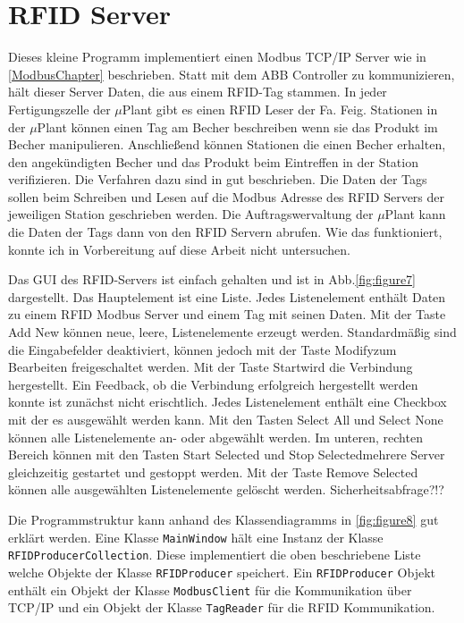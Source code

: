 \newpage
\section {RFID Server}

Dieses kleine Programm implementiert einen Modbus TCP/IP Server wie in \ref{ModbusChapter} beschrieben.
Statt mit dem ABB Controller zu kommunizieren, hält dieser Server Daten, die aus einem RFID-Tag stammen.
In jeder Fertigungszelle der $\mu$Plant gibt es einen RFID Leser der Fa. Feig.
Stationen in der $\mu$Plant können einen Tag am Becher beschreiben wenn sie das Produkt im Becher manipulieren.
Anschließend können Stationen die einen Becher erhalten, den angekündigten Becher und das Produkt beim Eintreffen
in der Station verifizieren.
Die Verfahren dazu sind in \cite{LarsKistner2016} gut beschrieben.
Die Daten der Tags sollen beim Schreiben und Lesen auf die Modbus Adresse des RFID Servers der jeweiligen Station
geschrieben werden.
Die Auftragswervaltung der $\mu$Plant kann die Daten der Tags dann von den RFID Servern abrufen.
Wie das funktioniert, konnte ich in Vorbereitung auf diese Arbeit nicht untersuchen.

Das GUI des RFID-Servers ist einfach gehalten und ist in Abb.\ref{fig:figure7} dargestellt.
Das Hauptelement ist eine Liste.
Jedes Listenelement enthält Daten zu einem RFID Modbus Server und einem Tag mit seinen Daten.
Mit der Taste \glqq Add New \grqq können neue, leere, Listenelemente erzeugt werden.
Standardmäßig sind die Eingabefelder deaktiviert, können jedoch mit der Taste \glqq Modify\grqq zum Bearbeiten
freigeschaltet werden.
Mit der Taste \glqq Start\grqq wird die Verbindung hergestellt. Ein Feedback, ob die Verbindung erfolgreich hergestellt
werden konnte ist zunächst nicht erischtlich.
Jedes Listenelement enthält eine Checkbox mit der es ausgewählt werden kann.
Mit den Tasten \glqq Select All \grqq und \glqq Select None \grqq können alle Listenelemente an- oder abgewählt werden.
Im unteren, rechten Bereich können mit den Tasten \glqq Start Selected \grqq und \glqq Stop Selected\grqq mehrere Server
gleichzeitig gestartet und gestoppt werden.
Mit der Taste \glqq Remove Selected \grqq können alle ausgewählten Listenelemente gelöscht werden.
Sicherheitsabfrage?!?

Die Programmstruktur kann anhand des Klassendiagramms in \ref{fig:figure8} gut erklärt werden.
Eine Klasse \verb|MainWindow| hält eine Instanz der Klasse \verb|RFIDProducerCollection|.
Diese implementiert die oben beschriebene Liste welche Objekte der Klasse \verb|RFIDProducer| speichert.
Ein \verb|RFIDProducer| Objekt enthält ein Objekt der Klasse \verb|ModbusClient| für die Kommunikation über TCP/IP und
ein Objekt der Klasse \verb|TagReader| für die RFID Kommunikation.

